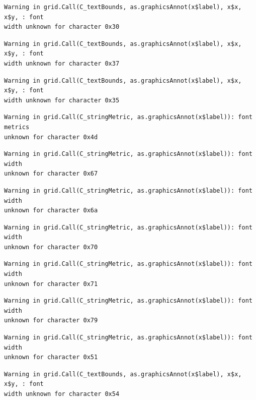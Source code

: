 \documentclass[
  letterpaper,
  DIV=11,
  numbers=noendperiod]{scrreprt}
\begin{document}
\begin{verbatim}
Warning in grid.Call(C_textBounds, as.graphicsAnnot(x$label), x$x, x$y, : font
width unknown for character 0x30
\end{verbatim}

\begin{verbatim}
Warning in grid.Call(C_textBounds, as.graphicsAnnot(x$label), x$x, x$y, : font
width unknown for character 0x37
\end{verbatim}

\begin{verbatim}
Warning in grid.Call(C_textBounds, as.graphicsAnnot(x$label), x$x, x$y, : font
width unknown for character 0x35
\end{verbatim}

\begin{verbatim}
Warning in grid.Call(C_stringMetric, as.graphicsAnnot(x$label)): font metrics
unknown for character 0x4d
\end{verbatim}

\begin{verbatim}
Warning in grid.Call(C_stringMetric, as.graphicsAnnot(x$label)): font width
unknown for character 0x67
\end{verbatim}

\begin{verbatim}
Warning in grid.Call(C_stringMetric, as.graphicsAnnot(x$label)): font width
unknown for character 0x6a
\end{verbatim}

\begin{verbatim}
Warning in grid.Call(C_stringMetric, as.graphicsAnnot(x$label)): font width
unknown for character 0x70
\end{verbatim}

\begin{verbatim}
Warning in grid.Call(C_stringMetric, as.graphicsAnnot(x$label)): font width
unknown for character 0x71
\end{verbatim}

\begin{verbatim}
Warning in grid.Call(C_stringMetric, as.graphicsAnnot(x$label)): font width
unknown for character 0x79
\end{verbatim}

\begin{verbatim}
Warning in grid.Call(C_stringMetric, as.graphicsAnnot(x$label)): font width
unknown for character 0x51
\end{verbatim}

\begin{verbatim}
Warning in grid.Call(C_textBounds, as.graphicsAnnot(x$label), x$x, x$y, : font
width unknown for character 0x54
\end{verbatim}
\end{document}
